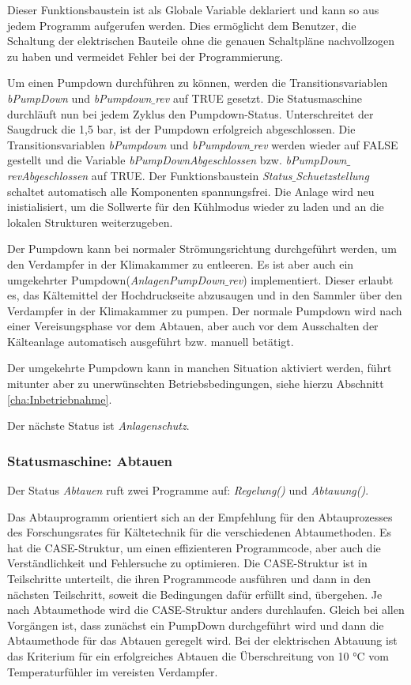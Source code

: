 Dieser Funktionsbaustein ist als Globale Variable deklariert und kann so aus jedem Programm aufgerufen werden. Dies ermöglicht dem Benutzer, die Schaltung der elektrischen Bauteile ohne die genauen Schaltpläne nachvollzogen zu haben und vermeidet Fehler bei der Programmierung. 

Um einen Pumpdown durchführen zu können, werden die Transitionsvariablen \textit{bPumpDown} und \textit{bPumpdown$\_$rev}  auf TRUE gesetzt. Die Statusmaschine durchläuft nun bei jedem Zyklus den Pumpdown-Status. Unterschreitet der Saugdruck die 1,5 bar, ist der Pumpdown erfolgreich abgeschlossen. Die Transitionsvariablen \textit{bPumpdown} und \textit{bPumpdown$\_$rev} werden wieder auf FALSE gestellt und die Variable \textit{bPumpDownAbgeschlossen} bzw. \textit{bPumpDown$\_$revAbgeschlossen} auf TRUE. Der Funktionsbaustein \textit{Status$\_$Schuetzstellung} schaltet automatisch alle Komponenten spannungsfrei. Die Anlage wird neu inistialisiert, um die Sollwerte für den Kühlmodus wieder zu laden und an die lokalen Strukturen weiterzugeben. 

Der Pumpdown kann bei normaler Strömungsrichtung durchgeführt werden, um den Verdampfer in der Klimakammer zu entleeren. Es ist aber auch ein umgekehrter Pumpdown(\textit{AnlagenPumpDown$\_$rev}) implementiert. Dieser erlaubt es, das Kältemittel der Hochdruckseite abzusaugen und in den Sammler über den Verdampfer in der Klimakammer zu pumpen. Der normale Pumpdown wird nach einer Vereisungsphase vor dem Abtauen, aber auch vor dem Ausschalten der Kälteanlage automatisch ausgeführt bzw. manuell betätigt. 

Der umgekehrte Pumpdown kann in manchen Situation aktiviert werden, führt mitunter aber zu unerwünschten Betriebsbedingungen, siehe hierzu Abschnitt \ref{cha:Inbetriebnahme}. 

Der nächste Status ist \textit{Anlagenschutz}.

\subsubsection*{Statusmaschine: Abtauen}

Der Status \textit{Abtauen} ruft zwei Programme auf:\textit{ Regelung()} und \textit{Abtauung()}. 

Das Abtauprogramm orientiert sich  an der Empfehlung für den Abtauprozesses des Forschungsrates für Kältetechnik für die verschiedenen Abtaumethoden. Es hat die CASE-Struktur, um einen effizienteren Programmcode, aber auch die Verständlichkeit und Fehlersuche zu optimieren. Die CASE-Struktur ist in Teilschritte unterteilt, die ihren Programmcode ausführen und dann in den nächsten Teilschritt, soweit die Bedingungen dafür erfüllt sind,  übergehen. Je nach Abtaumethode wird die CASE-Struktur anders durchlaufen. Gleich  bei allen Vorgängen ist, dass zunächst ein PumpDown durchgeführt wird und dann die Abtaumethode für das Abtauen geregelt wird. Bei der elektrischen Abtauung ist das Kriterium für ein erfolgreiches Abtauen die Überschreitung von 10 °C vom Temperaturfühler im vereisten Verdampfer. 

